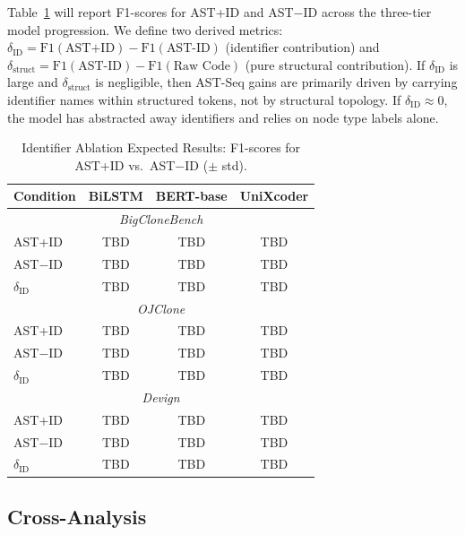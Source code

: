 \documentclass[pdflatex,sn-mathphys,Numbered]{sn-jnl}
\newcommand{\RQFourBFS}{TBD}        %
\newcommand{\RQFourDFS}{TBD}        %
\begin{document}
Table~\ref{tab:ablation} will report F1-scores for AST+ID and AST$-$ID across the three-tier model progression. We define two derived metrics: $\delta_{\text{ID}} = \text{F1}(\text{AST+ID}) - \text{F1}(\text{AST-ID})$ (identifier contribution) and $\delta_{\text{struct}} = \text{F1}(\text{AST-ID}) - \text{F1}(\text{Raw Code})$ (pure structural contribution). If $\delta_{\text{ID}}$ is large and $\delta_{\text{struct}}$ is negligible, then AST-Seq gains are primarily driven by carrying identifier names within structured tokens, not by structural topology. If $\delta_{\text{ID}} \approx 0$, the model has abstracted away identifiers and relies on node type labels alone.

\begin{table}[tb]
\centering
\caption{Identifier Ablation Expected Results: F1-scores for AST+ID vs.\ AST$-$ID ($\pm$ std).}\label{tab:ablation}
\begin{tabular}{lccc}
\toprule
Condition & BiLSTM & BERT-base & UniXcoder \\
\midrule
\multicolumn{4}{c}{\textit{BigCloneBench}} \\
AST+ID   & \RQFourBFS{}  & \RQFourBFS{}  & \RQFourBFS{} \\
AST$-$ID & \RQFourDFS{}  & \RQFourDFS{}  & \RQFourDFS{} \\
$\delta_{\text{ID}}$ & TBD & TBD & TBD \\
\midrule
\multicolumn{4}{c}{\textit{OJClone}} \\
AST+ID   & \RQFourBFS{}  & \RQFourBFS{}  & \RQFourBFS{} \\
AST$-$ID & \RQFourDFS{}  & \RQFourDFS{}  & \RQFourDFS{} \\
$\delta_{\text{ID}}$ & TBD & TBD & TBD \\
\midrule
\multicolumn{4}{c}{\textit{Devign}} \\
AST+ID   & \RQFourBFS{}  & \RQFourBFS{}  & \RQFourBFS{} \\
AST$-$ID & \RQFourDFS{}  & \RQFourDFS{}  & \RQFourDFS{} \\
$\delta_{\text{ID}}$ & TBD & TBD & TBD \\
\bottomrule
\end{tabular}
\end{table}

\subsection{Cross-Analysis}
\end{document}

